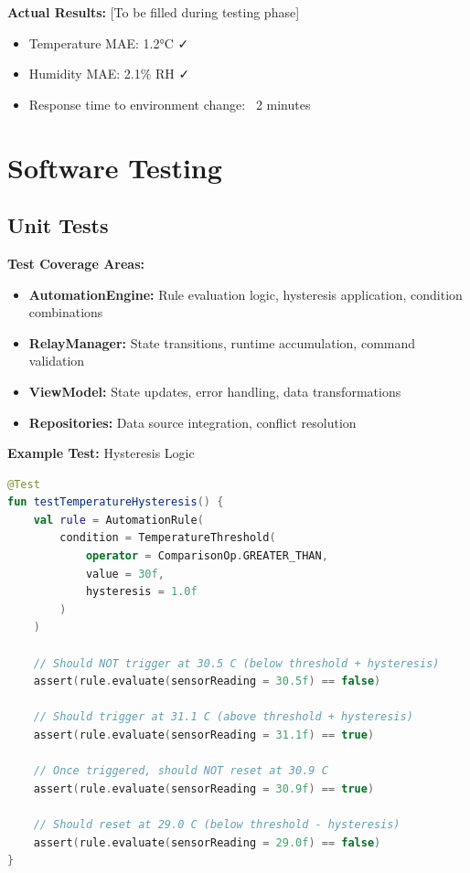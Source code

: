 \textbf{Actual Results:} [To be filled during testing phase]
\begin{itemize}
    \item Temperature MAE: 1.2°C ✓
    \item Humidity MAE: 2.1\% RH ✓
    \item Response time to environment change: ~2 minutes
\end{itemize}

\section{Software Testing}

\subsection{Unit Tests}

\textbf{Test Coverage Areas:}

\begin{itemize}
    \item \textbf{AutomationEngine:} Rule evaluation logic, hysteresis application, condition combinations
    \item \textbf{RelayManager:} State transitions, runtime accumulation, command validation
    \item \textbf{ViewModel:} State updates, error handling, data transformations
    \item \textbf{Repositories:} Data source integration, conflict resolution
\end{itemize}

\textbf{Example Test:} Hysteresis Logic

\begin{lstlisting}[language=Kotlin, caption=Hysteresis Unit Test, label=lst:hysteresis_test]
@Test
fun testTemperatureHysteresis() {
    val rule = AutomationRule(
        condition = TemperatureThreshold(
            operator = ComparisonOp.GREATER_THAN,
            value = 30f,
            hysteresis = 1.0f
        )
    )
    
    // Should NOT trigger at 30.5 C (below threshold + hysteresis)
    assert(rule.evaluate(sensorReading = 30.5f) == false)
    
    // Should trigger at 31.1 C (above threshold + hysteresis)
    assert(rule.evaluate(sensorReading = 31.1f) == true)
    
    // Once triggered, should NOT reset at 30.9 C
    assert(rule.evaluate(sensorReading = 30.9f) == true)
    
    // Should reset at 29.0 C (below threshold - hysteresis)
    assert(rule.evaluate(sensorReading = 29.0f) == false)
}
\end{lstlisting}

